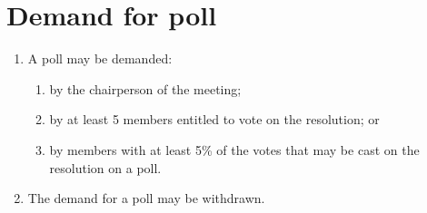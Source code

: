 \section{Demand for poll}

\begin{enumerate}[label=(\alph*)]
    \item A poll may be demanded:
    \begin{enumerate}[label=(\roman*)]
        \item by the chairperson of the meeting;
        \item by at least 5 members entitled to vote on the resolution; or
        \item by members with at least 5\% of the votes that may be cast on the resolution on a poll.
    \end{enumerate}
    
    \item The demand for a poll may be withdrawn.
\end{enumerate} 